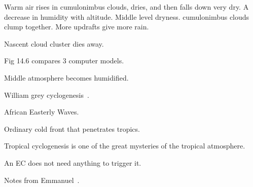 Warm air rises in cumulonimbus clouds,
 dries, and then falls down very dry.
A decrease in humidity with altitude.
 Middle level dryness.
cumulonimbus clouds clump together.
 More updrafts give more rain.

Nascent cloud cluster dies away.

Fig 14.6 compares 3 computer models.

Middle atmosphere becomes humidified.

William grey cyclogenesis~\cite{gray1975tropical}.

African Easterly Waves.

Ordinary cold front that penetrates tropics.

Tropical cyclogenesis is one of the
 great mysteries of the tropical atmosphere.

An EC does not need anything to trigger it.

Notes from Emmanuel~\cite{emanuel2005divine}.
